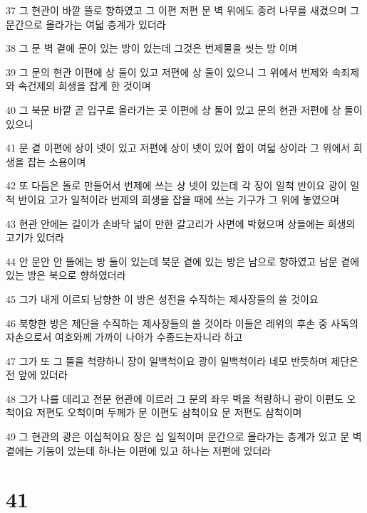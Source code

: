 \par 37 그 현관이 바깥 뜰로 향하였고 그 이편 저편 문 벽 위에도 종려 나무를 새겼으며 그 문간으로 올라가는 여덟 층계가 있더라
\par 38 그 문 벽 곁에 문이 있는 방이 있는데 그것은 번제물을 씻는 방 이며
\par 39 그 문의 현관 이편에 상 둘이 있고 저편에 상 둘이 있으니 그 위에서 번제와 속죄제와 속건제의 희생을 잡게 한 것이며
\par 40 그 북문 바깥 곧 입구로 올라가는 곳 이편에 상 둘이 있고 문의 현관 저편에 상 둘이 있으니
\par 41 문 곁 이편에 상이 넷이 있고 저편에 상이 넷이 있어 합이 여덟 상이라 그 위에서 희생을 잡는 소용이며
\par 42 또 다듬은 돌로 만들어서 번제에 쓰는 상 넷이 있는데 각 장이 일척 반이요 광이 일척 반이요 고가 일척이라 번제의 희생을 잡을 때에 쓰는 기구가 그 위에 놓였으며
\par 43 현관 안에는 길이가 손바닥 넒이 만한 갈고리가 사면에 박혔으며 상들에는 희생의 고기가 있더라
\par 44 안 문안 안 뜰에는 방 둘이 있는데 북문 곁에 있는 방은 남으로 향하였고 남문 곁에 있는 방은 북으로 향하였더라
\par 45 그가 내게 이르되 남향한 이 방은 성전을 수직하는 제사장들의 쓸 것이요
\par 46 북향한 방은 제단을 수직하는 제사장들의 쓸 것이라 이들은 레위의 후손 중 사독의 자손으로서 여호와께 가까이 나아가 수종드는자니라 하고
\par 47 그가 또 그 뜰을 척량하니 장이 일백척이요 광이 일백척이라 네모 반듯하며 제단은 전 앞에 있더라
\par 48 그가 나를 데리고 전문 현관에 이르러 그 문의 좌우 벽을 척량하니 광이 이편도 오척이요 저편도 오척이며 두께가 문 이편도 삼척이요 문 저편도 삼척이며
\par 49 그 현관의 광은 이십척이요 장은 십 일척이며 문간으로 올라가는 층계가 있고 문 벽 곁에는 기둥이 있는데 하나는 이편에 있고 하나는 저편에 있더라

\chapter{41}

